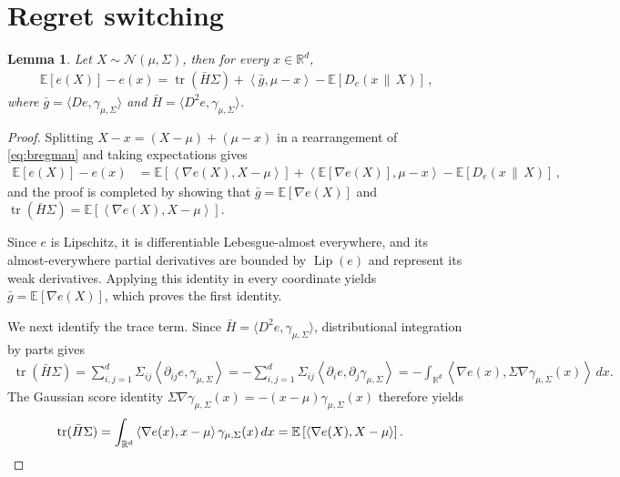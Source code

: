 \documentclass{article}
\newtheorem{lemma}[lemma]{Lemma}
\newcommand{\R}{\mathbb R}
\newcommand{\E}{\mathbb E}
\newcommand{\N}{\mathcal N}
\newcommand{\tr}{\operatorname{tr}}
\newcommand{\Lip}{\operatorname{Lip}}
\newcommand{\1}{\mathbf 1}
\newcommand{\ip}[2]{\left\langle #1,#2\right\rangle}
\begin{document}
\section{Regret switching}
\label{app:regret-switch}
\begin{lemma}
    \label{lem:regret-switch}
    Let $X\sim\N(\mu,\Sigma)$, then for every $x\in\R^d$,
    \begin{align}
        \E[e(X)]-e(x)
        =\tr(\bar{H}\Sigma)+\ip{\bar{g}}{\mu-x}-\E[D_e(x\,\|\,X)]\,,
        \label{eq:regret-switch}
    \end{align}
    where $\bar{g}=\langle De,\gamma_{\mu,\Sigma}\rangle$ and
    $\bar{H}=\langle D^2e,\gamma_{\mu,\Sigma}\rangle$.
\end{lemma}
\begin{proof}
    Splitting $X-x=(X-\mu)+(\mu-x)$ in a rearrangement of \eqref{eq:bregman} and taking expectations gives
    \begin{align}
        \E[e(X)]-e(x)
         & =
        \E\left[\ip{\nabla e(X)}{X-\mu}\right]
        +
        \ip{\E[\nabla e(X)]}{\mu-x}
        -
        \E[D_e(x\,\|\,X)]\,,
    \end{align}
    and the proof is completed by showing that $\bar{g}=\E[\nabla e(X)]$ and
    $\tr(\bar{H}\Sigma)=\E[\ip{\nabla e(X)}{X-\mu}]$.

    Since $e$ is Lipschitz, it is differentiable Lebesgue-almost everywhere,
    and its almost-everywhere partial derivatives are bounded by $\Lip(e)$
    and represent its weak derivatives.
    Applying this identity in every coordinate yields $\bar{g}=\E[\nabla e(X)]$,
    which proves the first identity.

    We next identify the trace term. Since
    $\bar{H}=\langle D^2e,\gamma_{\mu,\Sigma}\rangle$,
    distributional integration by parts gives
    \begin{align}
        \tr(\bar{H}\Sigma)
        =
        \sum_{i,j=1}^d
        \Sigma_{ij}
        \left\langle
        \partial_{ij}e,
        \gamma_{\mu,\Sigma}
        \right\rangle
        =
        -\sum_{i,j=1}^d
        \Sigma_{ij}
        \left\langle
        \partial_i e,
        \partial_j\gamma_{\mu,\Sigma}
        \right\rangle
        =
        -\int_{\R^d}
        \left\langle
        \nabla e(x),
        \Sigma\nabla\gamma_{\mu,\Sigma}(x)
        \right\rangle
        \,dx.
    \end{align}
    The Gaussian score identity
    $\Sigma\nabla\gamma_{\mu,\Sigma}(x)
        =
        -(x-\mu)\gamma_{\mu,\Sigma}(x)$
    therefore yields
    \begin{align}
        \tr(\bar{H}\Sigma)
         & =
        \int_{\R^d}
        \left\langle
        \nabla e(x),
        x-\mu
        \right\rangle
        \gamma_{\mu,\Sigma}(x)\,dx
        =
        \E\left[
            \left\langle
            \nabla e(X),
            X-\mu
            \right\rangle
            \right].
        \qedhere
    \end{align}
\end{proof}
\end{document}
